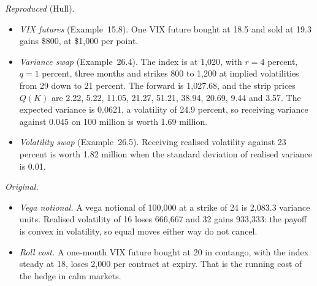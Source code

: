 \begin{qfmethod}
 \emph{Reproduced} (Hull).
\begin{itemize}
\item \emph{VIX futures} (Example~15.8). One VIX future bought at 18.5 and sold at 19.3 gains \$800, at \$1{,}000 per point.
\item \emph{Variance swap} (Example~26.4). The index is at 1{,}020, with $r=4$ percent, $q=1$ percent, three months and strikes 800 to 1{,}200 at implied volatilities from 29 down to 21 percent. The forward is 1{,}027.68, and the strip prices $Q(K)$ are 2.22, 5.22, 11.05, 21.27, 51.21, 38.94, 20.69, 9.44 and 3.57. The expected variance is 0.0621, a volatility of 24.9 percent, so receiving variance against 0.045 on 100 million is worth 1.69 million.
\item \emph{Volatility swap} (Example~26.5). Receiving realised volatility against 23 percent is worth 1.82 million when the standard deviation of realised variance is 0.01.
\end{itemize}

\emph{Original.}
\begin{itemize}
\item \emph{Vega notional.} A vega notional of 100{,}000 at a strike of 24 is 2{,}083.3 variance units. Realised volatility of 16 loses 666{,}667 and 32 gains 933{,}333: the payoff is convex in volatility, so equal moves either way do not cancel.
\item \emph{Roll cost.} A one-month VIX future bought at 20 in contango, with the index steady at 18, loses 2{,}000 per contract at expiry. That is the running cost of the hedge in calm markets.


\end{itemize}
\end{qfmethod}
